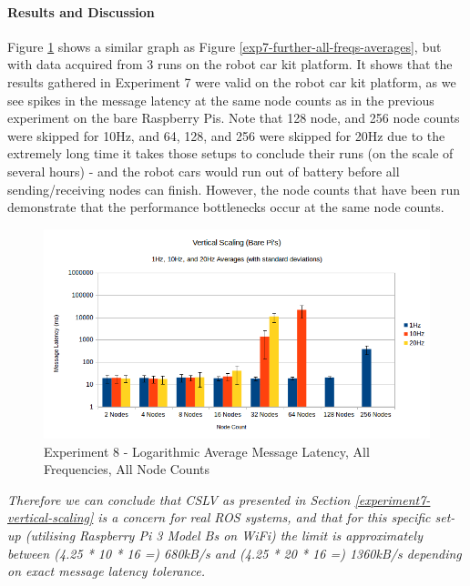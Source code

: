 \documentclass[../dissertation.tex]{subfiles}
\begin{document}
\paragraph{Results and Discussion} Figure \ref{exp8-all-freqs-averages} shows a similar graph as Figure \ref{exp7-further-all-freqs-averages}, but with data acquired from 3 runs on the robot car kit platform. It shows that the results gathered in Experiment 7 were valid on the robot car kit platform, as we see spikes in the message latency at the same node counts as in the previous experiment on the bare Raspberry Pis. Note that 128 node, and 256 node counts were skipped for 10Hz, and 64, 128, and 256 were skipped for 20Hz due to the extremely long time it takes those setups to conclude their runs (on the scale of several hours) - and the robot cars would run out of battery before all sending/receiving nodes can finish. However, the node counts that have been run demonstrate that the performance bottlenecks occur at the same node counts.

\begin{figure}[H]
\centering
\includegraphics[width=\textwidth]{images/experiment9/vertical_scaling_all_freqs_log_avg_msg_latency.png}
\caption{Experiment 8 - Logarithmic Average Message Latency, All Frequencies, All Node Counts}
\label{exp8-all-freqs-averages}
\end{figure}

\textit{Therefore we can conclude that CSLV as presented in Section \ref{experiment7-vertical-scaling} is a concern for real ROS systems, and that for this specific set-up (utilising Raspberry Pi 3 Model Bs on WiFi) the limit is approximately between (4.25 * 10 * 16 =) 680kB/s and (4.25 * 20 * 16 =) 1360kB/s depending on exact message latency tolerance.}
\end{document}
